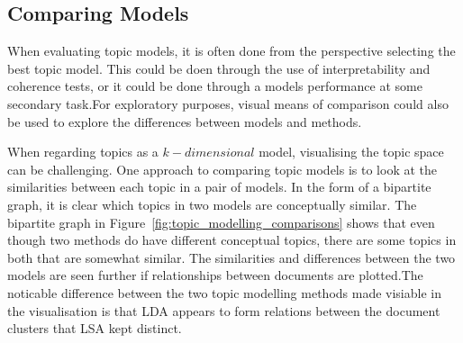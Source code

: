 \documentclass[10pt]{report}
\begin{document}
\subsection{Comparing Models}
When evaluating topic models, it is often done from the perspective selecting the best topic model. This could be doen through the use of interpretability and coherence tests, or it could be done through a models performance at some secondary task.For exploratory purposes, visual means of comparison could also be used to explore the differences between models and methods.

When regarding topics as a \(k-dimensional\) model, visualising the topic space can be challenging. One approach to comparing topic models is to look at the similarities between each topic in a pair of models. In the form of a bipartite graph, it is clear which topics in two models are conceptually similar. The bipartite graph in Figure~\ref{fig:topic_modelling_comparisons} shows that even though two methods do have different conceptual topics, there are some topics in both that are somewhat similar. The similarities and differences between the two models are seen further if relationships between documents are plotted.The noticable difference between the two topic modelling methods made visiable in the visualisation is that LDA appears to form relations between the document clusters that LSA kept distinct.~\cite{Crossno2011-sn}
\end{document}
